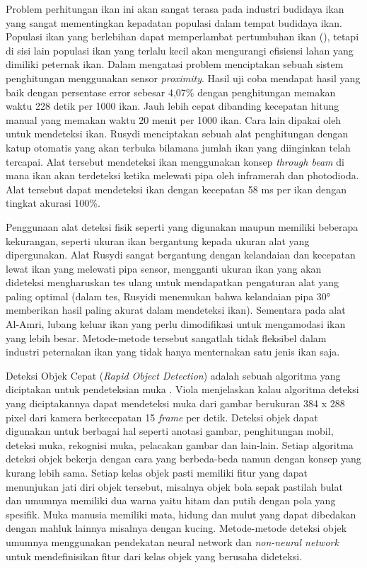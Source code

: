 Problem perhitungan ikan ini akan sangat terasa pada industri budidaya ikan yang 
sangat mementingkan kepadatan populasi dalam tempat budidaya ikan. Populasi ikan 
yang berlebihan dapat memperlambat pertumbuhan ikan (\cite{diansarietal}), tetapi 
di sisi lain populasi ikan yang terlalu kecil akan mengurangi efisiensi lahan 
yang dimiliki peternak ikan. Dalam mengatasi problem \cite{alamri} menciptakan 
sebuah sistem penghitungan menggunakan sensor \emph{proximity}. Hasil uji coba mendapat 
hasil yang baik dengan persentase error sebesar 4,07\% dengan penghitungan 
memakan waktu 228 detik per 1000 ikan. Jauh lebih cepat dibanding kecepatan 
hitung manual yang memakan waktu 20 menit per 1000 ikan. Cara lain dipakai 
oleh \cite{rusydi} untuk mendeteksi ikan. Rusydi menciptakan sebuah alat 
penghitungan dengan katup otomatis yang akan terbuka bilamana jumlah ikan 
yang diinginkan telah tercapai. Alat tersebut mendeteksi ikan menggunakan 
konsep \emph{through beam} di mana ikan akan terdeteksi ketika melewati pipa oleh 
inframerah dan photodioda. Alat tersebut dapat mendeteksi ikan dengan 
kecepatan 58 ms per ikan dengan tingkat akurasi 100\%.

Penggunaan alat deteksi fisik seperti yang digunakan \cite{alamri} maupun 
\cite{rusydi} memiliki beberapa kekurangan, seperti ukuran ikan bergantung 
kepada ukuran alat yang dipergunakan. Alat Rusydi sangat bergantung 
dengan kelandaian dan kecepatan lewat ikan yang melewati pipa sensor, mengganti 
ukuran ikan yang akan dideteksi mengharuskan tes ulang untuk 
mendapatkan pengaturan alat yang paling optimal (dalam tes, Rusyidi 
menemukan bahwa kelandaian pipa 30° memberikan hasil paling akurat dalam 
mendeteksi ikan). Sementara pada alat Al-Amri, lubang keluar 
ikan yang perlu dimodifikasi untuk mengamodasi ikan yang lebih besar. 
Metode-metode tersebut sangatlah tidak fleksibel dalam industri peternakan 
ikan yang tidak hanya menternakan satu jenis ikan saja.

Deteksi Objek Cepat (\emph{Rapid Object Detection}) adalah sebuah algoritma yang 
diciptakan untuk pendeteksian muka \cite{violaetal}. Viola 
menjelaskan kalau algoritma deteksi yang diciptakannya dapat mendeteksi 
muka dari gambar berukuran 384 x 288 pixel dari kamera berkecepatan 15 
\textit{frame} per detik. Deteksi objek dapat digunakan untuk berbagai hal seperti 
anotasi gambar, penghitungan mobil, deteksi muka, rekognisi muka, pelacakan 
gambar dan lain-lain. Setiap algoritma deteksi objek bekerja dengan cara yang 
berbeda-beda namun dengan konsep yang kurang lebih sama. Setiap kelas objek 
pasti memiliki fitur yang dapat menunjukan jati diri objek tersebut, misalnya 
objek bola sepak pastilah bulat dan umumnya memiliki dua warna yaitu hitam dan 
putih dengan pola yang spesifik. Muka manusia memiliki mata, hidung dan mulut 
yang dapat dibedakan dengan mahluk lainnya misalnya dengan kucing. Metode-metode 
deteksi objek umumnya menggunakan pendekatan neural network dan 
\textit{non-neural network} untuk mendefinisikan fitur dari kelas objek yang 
berusaha dideteksi.

